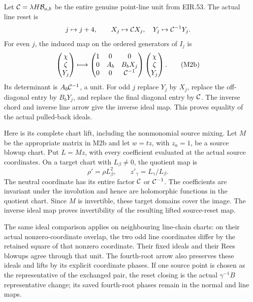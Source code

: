 Let \({\cal C}=\lambda H\mathcal B_{a,b}\) be the entire genuine
point-line unit from EIR.53. The actual line reset is
\[
 j\mapsto j+4,\qquad
 X_j\mapsto{\cal C}X_j,\quad
 Y_j\mapsto{\cal C}^{-1}Y_j .
\]
For even \(j\), the induced map on the ordered generators of \(I_j\) is
\[
 \begin{pmatrix}\chi\\\zeta\\Y_j\end{pmatrix}
 \longmapsto
 \begin{pmatrix}
 1&0&0\\0&A_b&B_bX_j\\0&0&{\cal C}^{-1}
 \end{pmatrix}
 \begin{pmatrix}\chi\\\zeta\\Y_j\end{pmatrix}.                  \tag{M2b}
\]
Its determinant is \(A_b{\cal C}^{-1}\), a unit. For odd \(j\)
replace \(Y_j\) by \(X_j\), replace the off-diagonal entry by
\(B_bY_j\), and replace the final diagonal entry by \({\cal C}\).
The inverse chord and inverse line arrow give the inverse ideal map.
This proves equality of the actual pulled-back ideals.

Here is its complete chart lift, including the nonmonomial source
mixing. Let \(M\) be the appropriate matrix in M2b and let
\(w=t z\), with \(z_a=1\), be a source blowup chart. Put
\(L=M z\), with every coefficient evaluated at the actual source
coordinates. On a target chart with \(L_\beta\ne0\), the quotient
map is
\[
 \rho'=\rho L_\beta^2,\qquad
 z'_\gamma=L_\gamma/L_\beta .
\]
The neutral coordinate has its entire factor
\({\cal C}\) or \({\cal C}^{-1}\). The coefficients are invariant
under the involution and hence are holomorphic functions in the
quotient chart. Since \(M\) is invertible, these target domains
cover the image. The inverse ideal map proves invertibility of
the resulting lifted source-reset map.

The same ideal comparison applies on neighbouring line-chain charts:
on their actual nonzero-coordinate overlap, the two odd line
coordinates differ by the retained square of that nonzero
coordinate. Their fixed ideals and their Rees blowups agree through
that unit. The fourth-root arrow also preserves these ideals and
lifts by its explicit coordinate phases. If one source point is
chosen as the representative of the exchanged pair, the reset
closing is the actual \(\gamma^{-1}B\) representative change; its
saved fourth-root phases remain in the normal and line maps.

